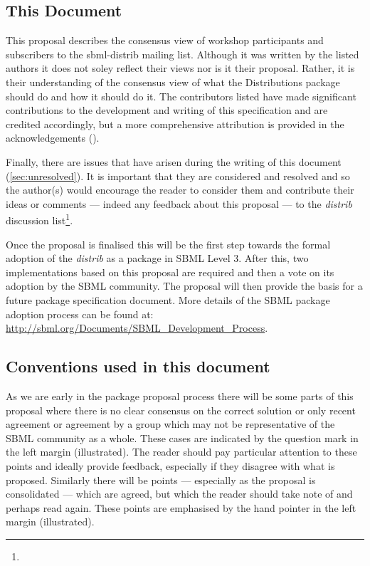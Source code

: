 \documentclass[draftspec]{sbmlpkgspec}
\newcommand{\distribshort}{\emph{distrib}\xspace}
\newcommand{\distrib}{Distributions\xspace}
\newcommand{\watchout}{\marginpar{\hspace*{34pt}\raisebox{-0.5ex}{\Large\ding{43}}}}
\newcommand{\controversial}{\marginpar{\hspace*{34pt}\raisebox{-0.5ex}{\Large?}}}
\begin{document}
\subsection{This Document}

This proposal describes the consensus view of workshop participants
and subscribers to the sbml-distrib mailing list. Although it was
written by the listed authors it does not soley reflect their views nor is
it their proposal. Rather, it is their understanding of the consensus
view of what the \distrib package should do and how it should do
it. The contributors listed have made significant contributions to the
development and writing of this specification and are credited
accordingly, but a more comprehensive attribution is provided in the
acknowledgements ().

Finally, there are issues that have arisen during the writing of this
document (\ref{sec:unresolved}). It is important that they are
considered and resolved and so the author(s) would encourage the
reader to consider them and contribute their ideas or comments ---
indeed any feedback about this proposal --- to the \distribshort
discussion list\footnote{}.

Once the proposal is finalised this will be the first step towards the
formal adoption of the \distribshort as a package in SBML Level
3. After this, two implementations based on this proposal are required
and then a vote on its adoption by the SBML community. The proposal
will then provide the basis for a future package specification
document. More details of the SBML package adoption process can be
found at: \url{http://sbml.org/Documents/SBML_Development_Process}.


\subsection{Conventions used in this document}

As we are early in the package proposal process there will be some
parts of this proposal where there is no clear consensus on the
correct solution or only recent agreement or agreement by a group
which may not be representative of the SBML community as a
whole. These cases are indicated by the \controversial question mark
in the left margin (illustrated). The reader should pay particular
attention to these points and ideally provide feedback, especially if
they disagree with what is proposed. Similarly there will be points
--- especially as the proposal is consolidated --- which are agreed,
but which the reader should take note of and perhaps read again. These
points \watchout are emphasised by the hand pointer in the left margin
(illustrated).
\end{document}
